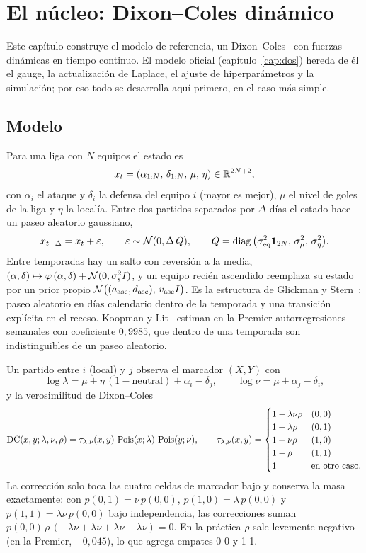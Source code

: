 \chapter{El núcleo: Dixon–Coles dinámico}
\label{cap:nucleo}

Este capítulo construye el modelo de referencia, un Dixon–Coles~\cite{dixoncoles1997} con fuerzas dinámicas en tiempo continuo. El modelo oficial (capítulo~\ref{cap:dos}) hereda de él el gauge, la actualización de Laplace, el ajuste de hiperparámetros y la simulación; por eso todo se desarrolla aquí primero, en el caso más simple.

\section{Modelo}

Para una liga con $N$ equipos el estado es
\[
x_t=(\alpha_{1:N},\,\delta_{1:N},\,\mu,\,\eta)\in\mathbb{R}^{2N+2},
\]
con $\alpha_i$ el ataque y $\delta_i$ la defensa del equipo $i$ (mayor es mejor), $\mu$ el nivel de goles de la liga y $\eta$ la localía. Entre dos partidos separados por $\Delta$ días el estado hace un paseo aleatorio gaussiano,
\begin{equation}
x_{t+\Delta}=x_t+\varepsilon,\qquad \varepsilon\sim\mathcal{N}(0,\Delta\,Q),\qquad Q=\operatorname{diag}\big(\sigma_\text{eq}^2\mathbf 1_{2N},\,\sigma_\mu^2,\,\sigma_\eta^2\big).
\label{eq:paseo}
\end{equation}
Entre temporadas hay un salto con reversión a la media, $(\alpha,\delta)\mapsto\varphi\,(\alpha,\delta)+\mathcal{N}(0,\sigma_s^2 I)$, y un equipo recién ascendido reemplaza su estado por un prior propio $\mathcal{N}\big((a_\text{asc},d_\text{asc}),\,v_\text{asc}I\big)$. Es la estructura de Glickman y Stern~\cite{glickmanstern1998}: paseo aleatorio en días calendario dentro de la temporada y una transición explícita en el receso. Koopman y Lit~\cite{koopmanlit2015} estiman en la Premier autorregresiones semanales con coeficiente $0{,}9985$, que dentro de una temporada son indistinguibles de un paseo aleatorio.

Un partido entre $i$ (local) y $j$ observa el marcador $(X,Y)$ con
\begin{equation}
\log\lambda=\mu+\eta\,(1-\text{neutral})+\alpha_i-\delta_j,\qquad \log\nu=\mu+\alpha_j-\delta_i,
\label{eq:predictor}
\end{equation}
y la verosimilitud de Dixon–Coles
\[
\operatorname{DC}(x,y;\lambda,\nu,\rho)=\tau_{\lambda,\nu}(x,y)\,\operatorname{Pois}(x;\lambda)\,\operatorname{Pois}(y;\nu),\qquad
\tau_{\lambda,\nu}(x,y)=\begin{cases}1-\lambda\nu\rho & (0,0)\\ 1+\lambda\rho & (0,1)\\ 1+\nu\rho & (1,0)\\ 1-\rho & (1,1)\\ 1 & \text{en otro caso.}\end{cases}
\]
La corrección solo toca las cuatro celdas de marcador bajo y conserva la masa exactamente: con $p(0,1)=\nu\,p(0,0)$, $p(1,0)=\lambda\,p(0,0)$ y $p(1,1)=\lambda\nu\,p(0,0)$ bajo independencia, las correcciones suman $p(0,0)\,\rho\,(-\lambda\nu+\lambda\nu+\lambda\nu-\lambda\nu)=0$. En la práctica $\rho$ sale levemente negativo (en la Premier, $-0{,}045$), lo que agrega empates 0-0 y 1-1.

